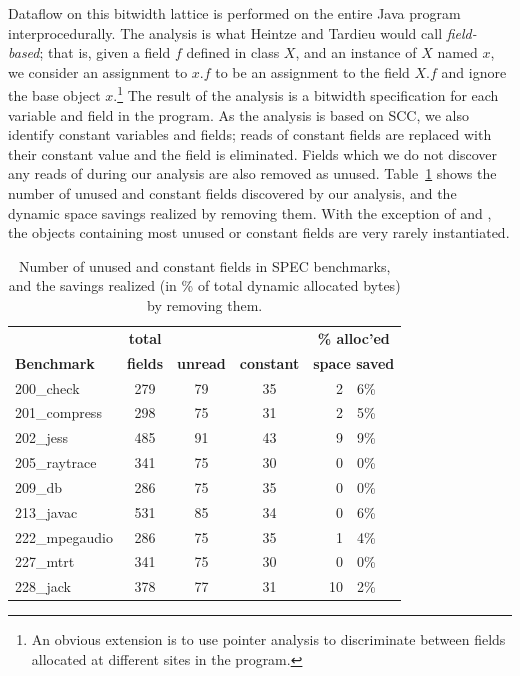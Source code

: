 \documentclass[preprint]{acmconf}
\begin{document}
Dataflow on this bitwidth lattice is performed on the entire Java
program interprocedurally.  The analysis is what Heintze and Tardieu
\cite{heintze01}
would call {\it field-based}; that is, given a field $f$ defined in
class $X$, and an instance of $X$ named $x$, we consider an assignment
to $x.f$ to be an assignment to the field $X.f$ and ignore the base
object $x$.\footnote{An obvious extension is to use pointer
analysis to discriminate between fields allocated at different sites
in the program.}  The result of the analysis is a bitwidth
specification for each variable and field in the program.  As the
analysis is based on SCC, we also identify constant variables and
fields; reads of constant fields are replaced with their constant
value and the field is eliminated.  Fields which we do not discover
any reads of during our analysis are also removed as unused.
Table~\ref{tab:const-unused} shows the number of unused and constant
fields discovered by our analysis, and the dynamic space savings
realized by removing them.  With the exception of  and
, the objects containing most unused or constant fields are
very rarely instantiated.
\begin{table}
\begin{tabular}{lcccr@{.}l}
&\bf total&&&\multicolumn{2}{c}{\bf\% alloc'ed}\\
\bf Benchmark &\bf fields &\bf unread &\bf constant &
\multicolumn{2}{c}{\bf space saved} \\\hline
200\_check	& 279 &   79   &   35   &  2&6\% \\
201\_compress	& 298 &   75   &   31   &  2&5\% \\
202\_jess	& 485 &   91   &   43   &  9&9\% \\
205\_raytrace	& 341 &   75   &   30   &  0&0\% \\
209\_db 	& 286 &   75   &   35   &  0&0\% \\
213\_javac	& 531 &   85   &   34   &  0&6\% \\
222\_mpegaudio	& 286 &   75   &   35   &  1&4\% \\
227\_mtrt	& 341 &   75   &   30   &  0&0\% \\
228\_jack	& 378 &   77   &   31   & 10&2\% \\
\end{tabular}
\caption{Number of unused and constant fields in SPEC benchmarks,
  and the savings realized (in \% of total dynamic allocated bytes) by
  removing them.}
\label{tab:const-unused}
\end{table}
\end{document}
